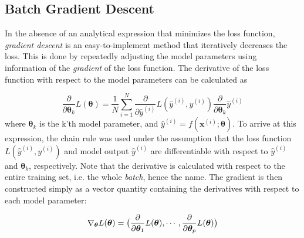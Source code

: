 

\subsection{Batch Gradient Descent}\label{sec:GradientDescent}
In the absence of an analytical expression that minimizes the loss function, \emph{gradient descent} is an easy-to-implement method that iteratively decreases the loss. This is done by repeatedly adjusting the model parameters using information of the \emph{gradient} of the loss function. The derivative of the loss function with respect to the model parameters can be calculated as

\begin{equation}\label{eq:LossDerivateWRTparameter}
    \frac{\partial}{\partial \boldsymbol{\theta}_k} L(\boldsymbol{\theta}) =
    \frac{1}{N}\sum_{i=1}^{N} \frac{\partial}{\partial \hat{y}^{(i)}} L( \hat{y}^{(i)}, y^{(i)})
    \frac{\partial}{\partial \boldsymbol{\theta}_k}\hat{y}^{(i)}
\end{equation}
where $\boldsymbol{\theta}_k$ is the k'th model parameter, and  $\hat{y}^{(i)} = f(\boldsymbol{x}^{(i)}; \boldsymbol{\theta})$. To arrive at this expression, the chain rule was used under the assumption that the loss function $L(\hat{y}^{(i)}, y^{(i)})$ and model output $\hat{y}^{(i)}$ are differentiable with respect to $\hat{y}^{(i)}$ and $\boldsymbol{\theta}_k$, respectively. Note that the derivative is calculated with respect to the entire training set, i.e. the whole \emph{batch}, hence the name. The gradient is then constructed simply as a vector quantity containing the derivatives with respect to each model parameter:

\begin{equation}\label{eq:Gradient}
    \nabla_{\boldsymbol{\theta}} L(\boldsymbol{\theta})= 
    \big{(} \frac{\partial}{\partial \boldsymbol{\theta}_1} L(\boldsymbol{\theta}), 
    \cdots, \frac{\partial}{\partial \boldsymbol{\theta}_p} L(\boldsymbol{\theta}) \big{)}
\end{equation}

